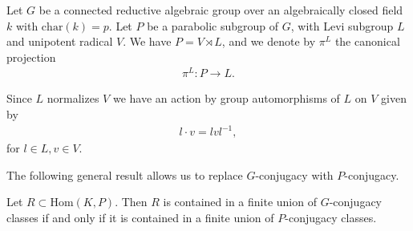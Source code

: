 Let $G$ be a connected reductive algebraic group over an algebraically closed field $k$ with $\mathrm{char}(k) = p$. Let $P$ be a parabolic subgroup of $G$, with Levi subgroup $L$ and unipotent radical $V$. We have $P = V \rtimes L$, and we denote by $\pi^L$ the canonical projection
\begin{align*} \pi^L:P \rightarrow L. \end{align*}

Since $L$ normalizes $V$ we have an action by group automorphisms of $L$ on $V$ given by
\begin{align} \label{laction} l \cdot v = lvl^{-1}, \end{align}
for $l \in L, v \in V$.


The following general result allows us to replace $G$-conjugacy with $P$-conjugacy.
\begin{lemma} Let $R \subset \mathrm{Hom}(K, P)$. Then $R$ is contained in a finite union of $G$-conjugacy classes if and only if it is contained in a finite union of $P$-conjugacy classes.
  \label{lem:GPconj}
\end{lemma}

